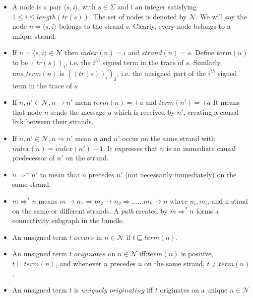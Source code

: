 	\begin{itemize}
		\item A node is a pair $\langle s,i\rangle$, with $s \in \Sigma$ and i an integer satisfying $1\leq i \leq length(tr(s))$. The set of nodes is denoted by $\mathcal{N}$. We will say the node $n= \langle s,i\rangle$ belongs to the strand s. Clearly, every node belongs to a unique strand. 

		\item If $n= \langle s,i \rangle \in \mathcal{N}$ then $index(n) = i$ and $strand(n)=s$. Define $term(n)$ to be $(tr(s))_i$, i.e. the $i^{th}$ signed term in the trace of $s$. Similarly, $uns\_term(n)$ is $((tr(s))_i)_2$, i.e. the unsigned part of the $i^{th}$ signed term in the trace of $s$

		\item If $n,n' \in \mathcal{N}, n \rightarrow n'$ mean $term(n) = +a$ and $term(n') = +a$ It means that node $n$ sends the message $a$ which is received by $n'$, creating a causal link between their strands.

		\item If $n,n' \in \mathcal{N}, n \Rightarrow n'$ mean $n$ and $n'$ occur on the same strand with $index(n)=index(n') -1 $. It expresses that $n$ is an immediate causal predecessor of $n'$ on the strand. 
		
		\item $n \Rightarrow^+ n'$ to mean that $n$ precedes $n'$ (not necessarily immediately) on the same strand.
			
		\item $m \Rightarrow^* n$ means $m \rightarrow n_1 \Rightarrow m_2 \rightarrow n_2 \Rightarrow ......m_k \rightarrow n$ where $n_i, m_i$, and n stand on the same or different strands. A \emph{path} created by $m \Rightarrow^* n$ forms a connectivity subgraph in the bundle. 

		\item An unsigned term $t$ $occurs$ in $n \in \mathcal{N}$ if $t \sqsubseteq term(n)$.

		\item An unsigned term $t$ $originates$ on $n \in \mathcal{N}$ iff:$term(n)$ is positive, $t \sqsubseteq term(n)$, and whenever $n$ precedes $n$ on the same strand, $t \not\sqsubseteq term(n)$.

		\item An unsigned term $t$ is $\textit{uniquely originating}$ iff $t$ originates on a unique $n \in \mathcal{N}$ 

	\end{itemize}

